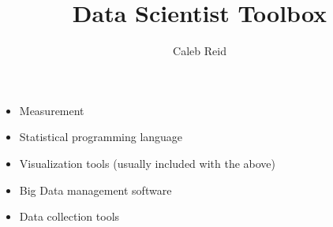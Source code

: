 \documentclass{article}
\title{Data Scientist Toolbox}
\author{Caleb Reid}
\begin{document}
    
\maketitle

\begin{itemize}
\item Measurement
\item Statistical programming language
\item Visualization tools (usually included with the above)
\item Big Data management software
\item Data collection tools
\end{itemize}
\end{document}
